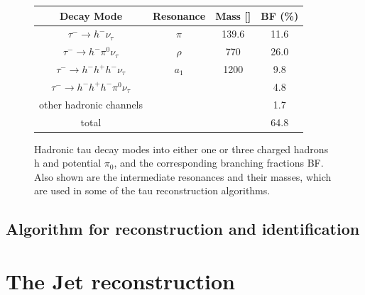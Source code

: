 \begin{figure}[tbh!]
	\begin{center}	
		\begin{tabular}{ | c | c | c | c |}
			\hline
			Decay Mode & Resonance & Mass [\mev] & BF (\%) \\ \hline
			\hline
			$\tau^{-}\longrightarrow h^{-}\nu_{\tau}$& $\pi$ & 139.6 & 11.6 \\ \hline
			$\tau^{-}\longrightarrow h^{-}\pi^{0}\nu_{\tau}$& $\rho$ & 770 & 26.0 \\ \hline
			$\tau^{-}\longrightarrow h^{-} h^{+} h^{-} \nu_{\tau}$& $a_{1}$& 1200 & 9.8 \\ \hline
			$\tau^{-}\longrightarrow h^{-} h^{+} h^{-} \pi^{0}\nu_{\tau}$& & & 4.8 \\ \hline
			other hadronic channels& & & 1.7 \\ \hline
			\hline
			total & & & 64.8 \\ \hline
			\hline
		\end{tabular}
		\caption{ Hadronic tau decay modes into either one or three charged hadrons h and potential $\pi_{0}$, and the corresponding branching fractions BF. Also shown are the intermediate resonances and their masses, which are used in some of the tau reconstruction algorithms.}
		\label{table:tau_hdecay}
	\end{center}
\end{figure}

\subsection{Algorithm for \hadtau reconstruction and identiﬁcation}



\clearpage

\section {The Jet reconstruction}

